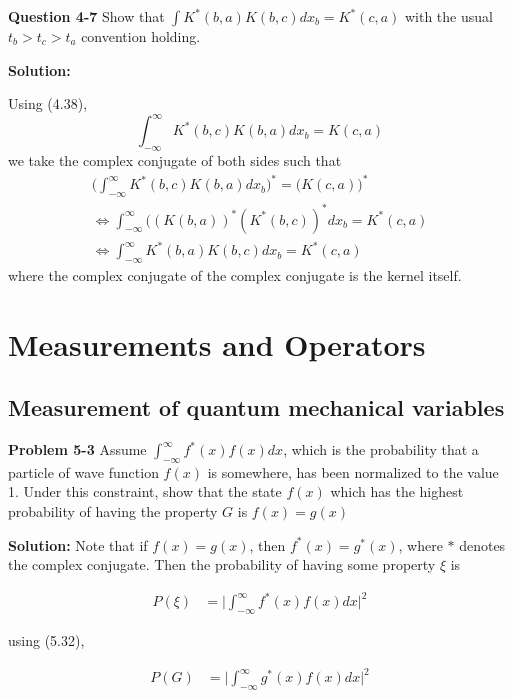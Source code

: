 \documentclass{article}
\begin{document}
\textbf{Question 4-7} Show that $\int K^{*}(b,a)K(b,c)dx_{b} = K^{*}(c,a)$ with the usual $t_{b} > t_{c} > t_{a}$ convention holding.

\textbf{Solution:} 

Using (4.38), 
\begin{equation*}
    \int_{-\infty}^{\infty} K^{*}(b,c)K(b,a) dx_{b} = K(c,a)
\end{equation*}
we take the complex conjugate of both sides such that 
\begin{multline*}
    \Big( \int_{-\infty}^{\infty} K^{*}(b,c)K(b,a) dx_{b} \Big)^{*} = \Big( K(c,a) \Big)^{*} \\ 
    \Longleftrightarrow \int_{-\infty}^{\infty} ((K(b,a))^{*} (K^{*}(b,c))^{*} dx_{b} = K^{*}(c,a) \\
    \Longleftrightarrow \int_{-\infty}^{\infty} K^{*}(b,a)K(b,c) dx_{b} = K^{*}(c,a)
\end{multline*}
where the complex conjugate of the complex conjugate is the kernel itself. 




\section{Measurements and Operators}

\subsection{Measurement of quantum mechanical variables}

\textbf{Problem 5-3}
Assume $\int_{-\infty}^{\infty}f^{*}(x)f(x)dx$, which is the probability that a particle of wave function $f(x)$ is somewhere, has been normalized to the value 1. Under this constraint, show that the state $f(x)$ which has the highest probability of having the property $G$ is $f(x) = g(x)$

\textbf{Solution:} 
Note that if $f(x) = g(x)$, then $f^{*}(x) = g^{*}(x)$, where $*$ denotes the complex conjugate. Then the probability of having some property $\xi$ is 

\begin{align*}
         P(\xi) &= \bigg | \int_{-\infty}^{\infty}f^{*}(x)f(x)dx \bigg |^{2}
\end{align*}

using (5.32), 

\begin{align*}
         P(G) &= \bigg | \int_{-\infty}^{\infty}g^{*}(x)f(x)dx \bigg |^{2}
\end{align*}
\end{document}
